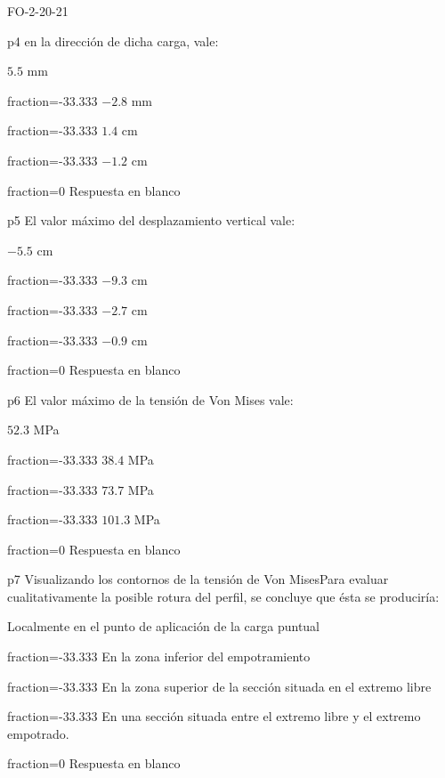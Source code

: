 \documentclass[a4paper]{article}
\begin{document}
\begin{quiz}{FO-2-20-21}
\begin{multi}{p4}
	en la direcci\'on de dicha carga, vale:
	\item* $5.5$ mm
	\item[fraction=-33.333] $-2.8$ mm
	\item[fraction=-33.333] $1.4$ cm
	\item[fraction=-33.333] $-1.2$ cm
	\item[fraction=0] Respuesta en blanco
\end{multi}
\begin{multi}{p5}
	El valor m\'aximo del desplazamiento vertical vale:
	\item* $-5.5$ cm
	\item[fraction=-33.333] $-9.3$ cm
	\item[fraction=-33.333] $-2.7$ cm
	\item[fraction=-33.333] $-0.9$ cm
	\item[fraction=0] Respuesta en blanco
\end{multi}
\begin{multi}{p6}
	El valor m\'aximo de la tensi\'on de Von Mises vale:
	\item* $52.3$ MPa
	\item[fraction=-33.333] $38.4$ MPa
	\item[fraction=-33.333] $73.7$ MPa
	\item[fraction=-33.333] $101.3$ MPa
	\item[fraction=0] Respuesta en blanco
\end{multi}
\begin{multi}{p7}
	Visualizando los contornos de la tensi\'on de Von MisesPara evaluar 
	cualitativamente la posible rotura del perfil, se concluye que \'esta
	se producir\'ia:
	\item* Localmente en el punto de aplicaci\'on de la carga puntual
	\item[fraction=-33.333] En la zona inferior del empotramiento
	\item[fraction=-33.333] En la zona superior de la secci\'on
	situada en el extremo libre
	\item[fraction=-33.333] En una secci\'on situada entre el extremo libre
	y el extremo empotrado.
	\item[fraction=0] Respuesta en blanco
\end{multi}

\end{quiz}
\end{document}
